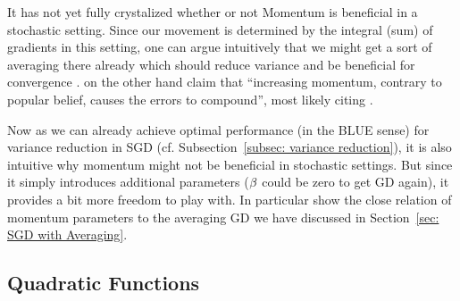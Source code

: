 It has not yet fully crystalized whether or not Momentum is beneficial in a
stochastic setting. Since our movement is determined by the integral (sum) of
gradients in this setting, one can argue intuitively that we might get a sort
of averaging there already which should reduce variance and be beneficial for convergence
\parencite[e.g.][p. 69]{bottouOptimizationMethodsLargeScale2018}. \textcite{gohWhyMomentumReally2017}
on the other hand claim that ``increasing momentum, contrary to popular
belief, causes the errors to compound'', most likely citing
\textcite{devolderFirstorderMethodsSmooth2014}.

Now as we can already achieve optimal performance (in the BLUE sense) for
variance reduction in SGD (cf. Subsection~\ref{subsec: variance reduction}),
it is also intuitive why momentum might not be beneficial in stochastic settings.
But since it simply introduces additional parameters (\(\beta\) could be zero
to get GD again), it provides a bit more freedom to play with. In particular
\textcite{flammarionAveragingAccelerationThere2015} show the close relation of 
momentum parameters to the averaging GD we have discussed in Section~\ref{sec:
SGD with Averaging}.

\subsection{Quadratic Functions}

